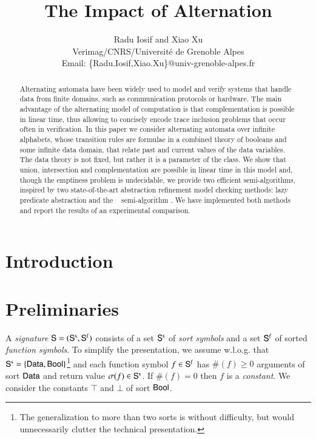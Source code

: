 \documentclass[10pt,conference,letterpaper,twocolumn]{IEEEtran}
\begin{document}

\title{The Impact of Alternation}

\author{Radu Iosif and Xiao Xu \\
Verimag/CNRS/Universit\'e de Grenoble Alpes\\
Email: \{Radu.Iosif,Xiao.Xu\}@univ-grenoble-alpes.fr}

\maketitle

\begin{abstract}
Alternating automata have been widely used to model and verify systems
that handle data from finite domains, such as communication protocols
or hardware. The main advantage of the alternating model of
computation is that complementation is possible in linear time, thus
allowing to concisely encode trace inclusion problems that occur often
in verification. In this paper we consider alternating automata over
infinite alphabets, whose transition rules are formulae in a combined
theory of booleans and some infinite data domain, that relate past and
current values of the data variables. The data theory is not fixed,
but rather it is a parameter of the class. We show that union,
intersection and complementation are possible in linear time in this
model and, though the emptiness problem is undecidable, we provide two
efficient semi-algorithms, inspired by two state-of-the-art
abstraction refinement model checking methods: lazy predicate
abstraction \cite{HJMS02} and the \impact~ semi-algorithm
\cite{mcmillan06}. We have implemented both methods and report the
results of an experimental comparison.
\end{abstract}

\section{Introduction}

\section{Preliminaries}

A \emph{signature} $\mathsf{S} = (\mathsf{S}^\mathrm{s},\mathsf{S}^\mathrm{f})$ consists of a
set $\mathsf{S}^\mathrm{s}$ of \emph{sort symbols} and a set $\mathsf{S}^\mathrm{f}$ of
sorted \emph{function symbols}. To simplify the presentation, we
assume w.l.o.g. that $\mathsf{S}^\mathrm{s} = \left\{ \mathsf{Data},\mathsf{Bool} \right\}$\footnote{The
  generalization to more than two sorts is without difficulty, but
  would unnecessarily clutter the technical presentation.} and each
function symbol $f \in \mathsf{S}^\mathrm{f}$ has $\#(f) \geq 0$ arguments of
sort $\mathsf{Data}$ and return value $\sigma(f) \in \mathsf{S}^\mathrm{s}$. If
$\#(f)=0$ then $f$ is a \emph{constant}. We consider the constants
$\top$ and $\bot$ of sort $\mathsf{Bool}$.
\end{document}
